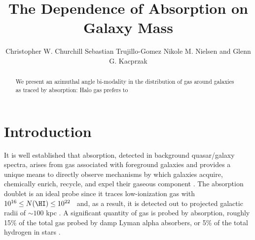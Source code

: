 \documentclass{emulateapj}
\begin{document}

\title{The Dependence of {\MgII} Absorption on Galaxy Mass}


\author{\sc
Christopher W. Churchill
Sebastian Trujillo-Gomez
Nikole M. Nielsen
and
Glenn G. Kacprzak
}
                                                                                

\begin{abstract}

We present an azimuthal angle bi-modality in the distribution of gas
around galaxies as traced by {\MgII} absorption: Halo gas prefers to

\end{abstract}




\section{Introduction}
\label{sec:intro}

It is well established that {\MgII} absorption, detected in background
quasar/galaxy spectra, arises from gas associated with foreground
galaxies and provides a unique means to directly observe mechanisms by
which galaxies acquire, chemically enrich, recycle, and expel their
gaseous component \citep[see][for a review]{cwc-china}.  The
{\MgIIdblt} absorption doublet is an ideal probe since it traces
low-ionization gas with $10^{16} \leq N(\HI) \leq 10^{22}$~{\cmsq}
\citep{archiveI,weakII} and, as a result, it is detected out to
projected galactic radii of $\sim 100$ kpc
\citep{kacprzak08,chen10a}. A significant quantity of gas is probed by
{\MgII} absorption, roughly 15\% of the total gas probed by damp Lyman
alpha absorbers, or 5\% of the total hydrogen in stars
\citep{kacprzak11c,menard12}.
\end{document}
